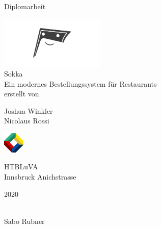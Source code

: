 \begin{titlepage}
	\begin{center}
		\Large{Diplomarbeit} \\
		
		\bigskip
		\bigskip
		\bigskip

		\includegraphics[width=5cm]{../images/sokka.png} \\
		\Huge{Sokka} \\
		\bigskip
		\bigskip
		\bigskip
		\huge{Ein modernes Bestellungssystem für Restaurants} \\

		\bigskip
		\bigskip
		\bigskip
		\large{erstellt von} \\

		\bigskip
		\bigskip
		\bigskip
		
		\Huge{Joshua Winkler} \\
		\Huge{Nicolaus Rossi} \\
		\bigskip
		\bigskip
		\bigskip

		
		\bigskip
	    \bigskip
        
        \includegraphics[width=1cm]{../images/htl-logo}

		\Large{HTBLuVA} \\
		\Large{Innsbruck Anichstrasse} \\

		\bigskip		
		\bigskip
		\bigskip
		
		\Large{2020}

	\end{center}

	\bigskip
	\bigskip
	\bigskip
	 \\
	Sabo Rubner
 
\end{titlepage}